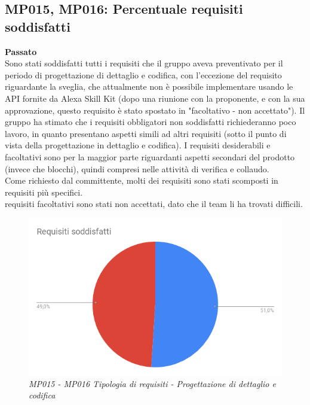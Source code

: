 \subsection{MP015, MP016: Percentuale requisiti soddisfatti}
\textbf{Passato}\\
Sono stati soddisfatti tutti i requisiti che il gruppo aveva preventivato per il periodo di progettazione di dettaglio e codifica, con l'eccezione del requisito riguardante la sveglia, che attualmente non è possibile implementare usando le API fornite da Alexa Skill Kit (dopo una riunione con la proponente, e con la sua approvazione,  questo requisito è stato spostato in "facoltativo - non accettato").
Il gruppo ha stimato che i requisiti obbligatori non soddisfatti richiederanno poco lavoro, in quanto presentano aspetti simili ad altri requisiti (sotto il punto di vista della progettazione in dettaglio e codifica). I requisiti desiderabili e facoltativi sono per la maggior parte riguardanti aspetti secondari del prodotto (invece che blocchi), quindi compresi nelle attività di verifica e collaudo.\\
Come richiesto dal committente, molti dei requisiti sono stati scomposti in requisiti più specifici.\\
requisiti facoltativi sono stati non accettati, dato che il team li ha trovati difficili.\\
\begin{figure} [H]
    \centering
	\includegraphics[scale=0.5]{./images/torsodPDC.png}
    \caption{\textit{MP015 - MP016 Tipologia di requisiti - Progettazione di dettaglio e codifica}}
\end{figure}

